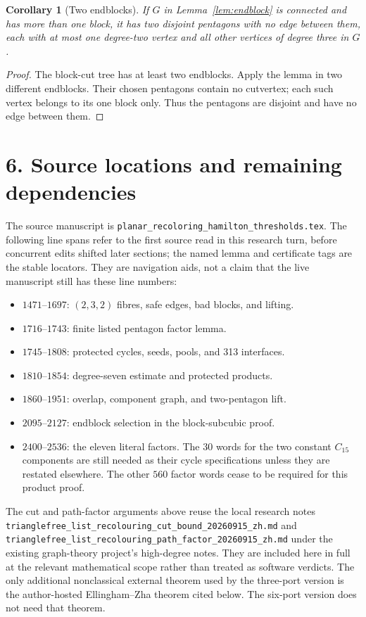 \documentclass[11pt]{article}
\newtheorem{corollary}[lemma]{Corollary}
\theoremstyle{remark}\newtheorem{remark}[lemma]{Remark}
\begin{document}
\begin{corollary}[Two endblocks]
If $G$ in Lemma~\ref{lem:endblock} is connected and has more than
one block, it has two disjoint pentagons with no edge between them,
each with at most one degree-two vertex and all other vertices of
degree three in $G$.
\end{corollary}
\begin{proof}
The block-cut tree has at least two endblocks. Apply the lemma in
two different endblocks. Their chosen pentagons contain no cutvertex;
each such vertex belongs to its one block only. Thus the pentagons
are disjoint and have no edge between them.
\end{proof}

\section*{6. Source locations and remaining dependencies}

The source manuscript is
\texttt{planar\_recoloring\_hamilton\_thresholds.tex}. The following
line spans refer to the first source read in this research turn,
before concurrent edits shifted later sections; the named lemma and
certificate tags are the stable locators. They are navigation aids,
not a claim that the live manuscript still has these line numbers:
\begin{itemize}
\item $1471$--$1697$: $(2,3,2)$ fibres, safe edges, bad blocks, and lifting.
\item $1716$--$1743$: finite listed pentagon factor lemma.
\item $1745$--$1808$: protected cycles, seeds, pools, and 313 interfaces.
\item $1810$--$1854$: degree-seven estimate and protected products.
\item $1860$--$1951$: overlap, component graph, and two-pentagon lift.
\item $2095$--$2127$: endblock selection in the block-subcubic proof.
\item $2400$--$2536$: the eleven literal factors. The $30$ words for
the two constant $C_{15}$ components are still needed as their cycle
specifications unless they are restated elsewhere. The other $560$
factor words cease to be required for this product proof.
\end{itemize}

The cut and path-factor arguments above reuse the local research
notes \nolinkurl{trianglefree_list_recolouring_cut_bound_20260915_zh.md}
and \nolinkurl{trianglefree_list_recolouring_path_factor_20260915_zh.md}
under the existing graph-theory project's high-degree notes. They are
included here in full at the relevant mathematical scope rather than
treated as software verdicts. The only additional nonclassical
external theorem used by the three-port version is the author-hosted
Ellingham--Zha theorem cited below. The six-port version does not
need that theorem.
\end{document}
